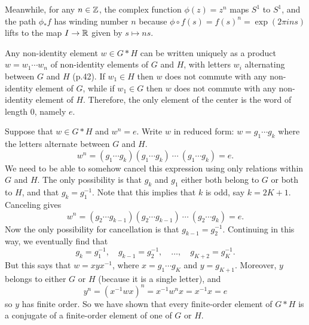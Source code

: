 Meanwhile, for any $n\in\mathbb{Z}$, the complex function $\phi(z)=z^n$ maps $S^1$ to $S^1$, and the path $\phi_* f$ has winding number $n$ because $\phi\circ f(s) = f(s)^n = \exp(2\pi ins)$ lifts to the map $I\to\mathbb{R}$ given by $s\mapsto ns$.  


\soln Any non-identity element $w\in G*H$ can be written uniquely
as a product $w=w_1\cdots w_n$ of non-identity elements of $G$ and $H$, with
letters $w_i$ alternating between $G$ and $H$ (p.42).
If $w_1\in H$ then $w$ does not commute with any non-identity element
of $G$, while if $w_1\in G$ then $w$ does not commute with any non-identity element
of $H$.  Therefore, the only element of the center is the word of length 0, namely $e$.


Suppose that $w\in G*H$ and $w^n=e$.
Write $w$ in reduced form: $w=g_1\cdots g_k$ where the letters alternate between $G$ and $H$.
$$w^n=(g_1\cdots g_k)(g_1\cdots g_k)\ \cdots\ (g_1\cdots g_k)=e.$$
We need to be able to somehow cancel this expression using only relations
within $G$ and $H$.  The only possibility is that $g_k$ and $g_1$ either both belong to $G$ or both to $H$, and that  $g_k=g_1^{-1}$.  Note that this implies that $k$ is odd, say $k=2K+1$.
Canceling gives
$$w^n=(g_2\cdots g_{k-1})(g_2\cdots g_{k-1})\ \cdots \ (g_2\cdots g_k)=e.$$
Now the only possibility for cancellation is that $g_{k-1}=g_2^{-1}$.   Continuing in this way, we eventually
find that
  $$g_k=g_1^{-1}, \quad g_{k-1}=g_2^{-1},\quad \dots,\quad g_{K+2}=g_K^{-1}.$$
But this says that $w=xyx^{-1}$, where $x=g_1\cdots g_K$ and $y=g_{K+1}$.
Moreover, $y$ belongs to either $G$ or $H$ (because it is a single letter), and
  $$y^n = (x^{-1}wx)^n = x^{-1}w^nx = x^{-1}x = e$$
so $y$ has finite order.  So we have shown that every finite-order element of $G*H$
is a conjugate of a finite-order element of one of $G$ or $H$.


